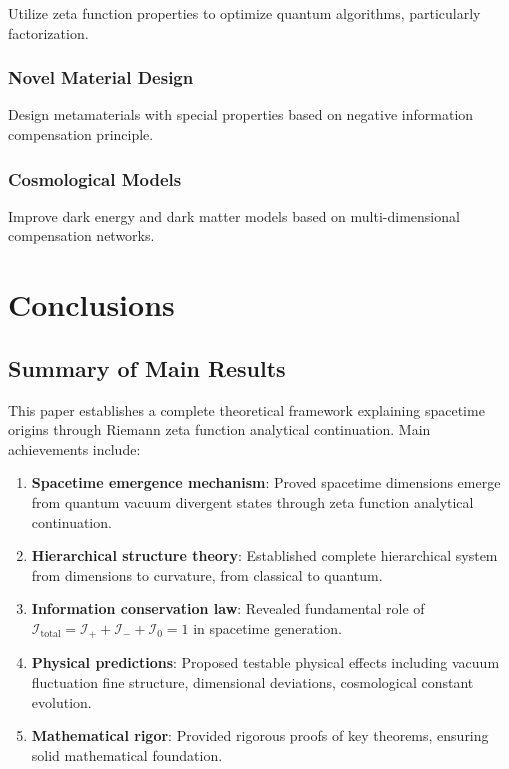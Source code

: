 \documentclass[12pt,a4paper]{article}
\begin{document}
Utilize zeta function properties to optimize quantum algorithms, particularly factorization.

\subsubsection{Novel Material Design}

Design metamaterials with special properties based on negative information compensation principle.

\subsubsection{Cosmological Models}

Improve dark energy and dark matter models based on multi-dimensional compensation networks.

\section{Conclusions}

\subsection{Summary of Main Results}

This paper establishes a complete theoretical framework explaining spacetime origins through Riemann zeta function analytical continuation. Main achievements include:

\begin{enumerate}
\item \textbf{Spacetime emergence mechanism}: Proved spacetime dimensions emerge from quantum vacuum divergent states through zeta function analytical continuation.

\item \textbf{Hierarchical structure theory}: Established complete hierarchical system from dimensions to curvature, from classical to quantum.

\item \textbf{Information conservation law}: Revealed fundamental role of $\mathcal{I}_{\text{total}} = \mathcal{I}_+ + \mathcal{I}_- + \mathcal{I}_0 = 1$ in spacetime generation.

\item \textbf{Physical predictions}: Proposed testable physical effects including vacuum fluctuation fine structure, dimensional deviations, cosmological constant evolution.

\item \textbf{Mathematical rigor}: Provided rigorous proofs of key theorems, ensuring solid mathematical foundation.
\end{enumerate}
\end{document}
